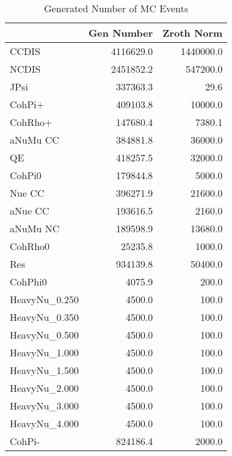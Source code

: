 
\begin{table}[h!]\centering
{\large{
\begin{tabular}{||l|r|r||}
\hline
\hline
      & Gen Number   & Zroth Norm  \\
\hline
  CCDIS               &  4116629.0 &  1440000.0 \\
  NCDIS               &  2451852.2 &   547200.0 \\
  JPsi                &   337363.3 &       29.6 \\
  CohPi+              &   409103.8 &    10000.0 \\
  CohRho+             &   147680.4 &     7380.1 \\
  aNuMu CC            &   384881.8 &    36000.0 \\
  QE                  &   418257.5 &    32000.0 \\
  CohPi0              &   179844.8 &     5000.0 \\
   Nue CC             &   396271.9 &    21600.0 \\
  aNue CC             &   193616.5 &     2160.0 \\
  aNuMu NC            &   189598.9 &    13680.0 \\
  CohRho0             &    25235.8 &     1000.0 \\
  Res                 &   934139.8 &    50400.0 \\
  CohPhi0             &     4075.9 &      200.0 \\
  HeavyNu\_0.250      &     4500.0 &      100.0 \\
  HeavyNu\_0.350      &     4500.0 &      100.0 \\
  HeavyNu\_0.500      &     4500.0 &      100.0 \\
  HeavyNu\_1.000      &     4500.0 &      100.0 \\
  HeavyNu\_1.500      &     4500.0 &      100.0 \\
  HeavyNu\_2.000      &     4500.0 &      100.0 \\
  HeavyNu\_3.000      &     4500.0 &      100.0 \\
  HeavyNu\_4.000      &     4500.0 &      100.0 \\
  CohPi-              &   824186.4 &     2000.0 \\
\hline
\hline
\end{tabular}
\caption{Generated Number of MC Events}
\label{tab-gen-numbers}
}}
\end{table}
\endinput